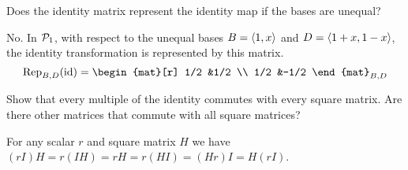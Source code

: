 \begin{exercises}
\begin{answer}
    \end{answer}
  \item 
    Does the identity matrix represent the identity map if the bases are
    unequal?
    \begin{answer}
      No.
      In \( \mathcal{P}_1 \), with respect to the unequal bases
      \( B=\langle1,x\rangle \) and \( D=\langle1+x,1-x\rangle \),
      the identity transformation is represented by this matrix.
      \begin{equation*}
         \rep{\text{id}}{B,D}=
         \begin{mat}[r]
           1/2  &1/2  \\
           1/2  &-1/2
         \end{mat}_{B,D}
      \end{equation*}   
    \end{answer}
  \item 
    Show that every multiple of the identity commutes with every
    square matrix.
    Are there other matrices that commute with all square matrices?
    \begin{answer}
      For any scalar \( r \) and square matrix \( H \) we have
      \( (rI)H=r(IH)=rH=r(HI)=(Hr)I=H(rI) \).


\end{answer}
\end{exercises}
